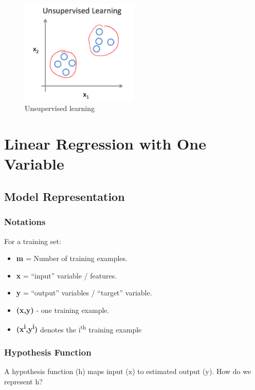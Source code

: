 \documentclass[letter]{article}
\begin{document}
    \begin{figure}[h]
        \centering
        \includegraphics[width=0.5\textwidth]{image/unsupervised-learning.png}
        \caption{Unsupervised learning}
        \label{fig:unsupervised-learning}
    \end{figure}
\section{Linear Regression with One Variable}
    \subsection{Model Representation}
        \subsubsection{Notations}
            For a training set:
           \begin{itemize}
               \item \textbf{m} = Number of training examples.
               \item \textbf{x} = ``input'' variable / features.
               \item \textbf{y} = ``output'' variables / ``target'' variable.
               \item \textbf{(x,y)} - one training example.
               \item \textbf{(x\textsuperscript{i},y\textsuperscript{i})} denotes the i\textsuperscript{th} training example 

           \end{itemize}

        \subsubsection{Hypothesis Function}
        
           A hypothesis function (h) maps input (x) to estimated output (y).
           How do we represent h?
\end{document}

